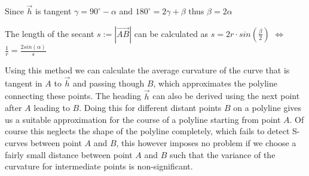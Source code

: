 Since $\vec h$ is tangent $\gamma=90^{\circ} - \alpha$ and $180^{\circ}=2\gamma+\beta$ thus $\beta = 2 \alpha$


The length of the secant $s:=|\vec{AB}|$ can be calculated as
$s = 2r \cdot  sin(\frac{\beta}{2})$
$\Leftrightarrow$
$\frac{1}{r} = \frac{2sin(\alpha)}{s}$

Using this method we can calculate the average curvature of the curve that is tangent in $A$ to $\vec h$ and passing though $B$, which approximates the polyline connecting these points. The heading  $\vec h$ can also be derived using the next point after $A$ leading to $B$.
Doing this for different distant points $B$ on a polyline gives us a suitable approximation for the course of a polyline starting from point $A$. Of course this neglects the shape of the polyline completely, which fails to detect S-curves between point $A$ and $B$, this however imposes no problem if we choose a fairly small distance between point $A$ and $B$ such that the variance of the curvature for intermediate points is non-significant.